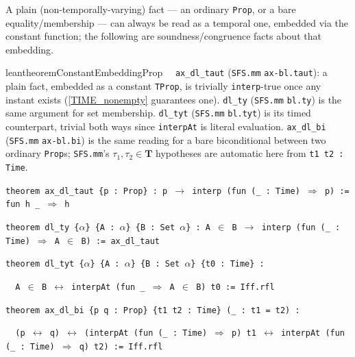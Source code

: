 \pn A plain (non-temporally-varying) fact --- an ordinary \texttt{Prop}, or a bare equality/membership --- can always be read as a temporal one, embedded via the constant function; the following are soundness/congruence facts about that embedding.

\begin{restatable}{leantheorem}{ConstantEmbeddingProp}~~ \texttt{ax\_dl\_taut} (\texttt{SFS.mm} \texttt{ax-bl.taut}): a plain fact, embedded as a constant \texttt{TProp}, is trivially \texttt{interp}-true once any instant exists (\ref{TIME_nonempty} guarantees one). \texttt{dl\_ty} (\texttt{SFS.mm} \texttt{bl.ty}) is the same argument for set membership. \texttt{dl\_tyt} (\texttt{SFS.mm} \texttt{bl.tyt}) is its timed counterpart, trivial both ways since \texttt{interpAt} is literal evaluation. \texttt{ax\_dl\_bi} (\texttt{SFS.mm} \texttt{ax-bl.bi}) is the same reading for a bare biconditional between two ordinary \texttt{Prop}s; \texttt{SFS.mm}'s $\tau_1,\tau_2\in\mathbf{T}$ hypotheses are automatic here from \texttt{t1 t2 : Time}.

\texttt{\textcolor{leancolor}{theorem} \textcolor{leanyellow}{ax\_dl\_taut} \{p : Prop\} : p $\to$ interp (\textcolor{leancolor}{fun} (\_ : Time) $\Rightarrow$ p) := \textcolor{leancolor}{fun} h \_ $\Rightarrow$ h}

\texttt{\textcolor{leancolor}{theorem} \textcolor{leanyellow}{dl\_ty} \{$\alpha$\} \{A : $\alpha$\} \{B : Set $\alpha$\} : A $\in$ B $\to$ interp (\textcolor{leancolor}{fun} (\_ : Time) $\Rightarrow$ A $\in$ B) := ax\_dl\_taut}

\texttt{\textcolor{leancolor}{theorem} \textcolor{leanyellow}{dl\_tyt} \{$\alpha$\} \{A : $\alpha$\} \{B : Set $\alpha$\} \{t0 : Time\} :}

\texttt{~~A $\in$ B $\leftrightarrow$ interpAt (\textcolor{leancolor}{fun} \_ $\Rightarrow$ A $\in$ B) t0 := Iff.rfl}

\texttt{\textcolor{leancolor}{theorem} \textcolor{leanyellow}{ax\_dl\_bi} \{p q : Prop\} \{t1 t2 : Time\} (\_ : t1 = t2) :}

\texttt{~~(p $\leftrightarrow$ q) $\leftrightarrow$ (interpAt (\textcolor{leancolor}{fun} (\_ : Time) $\Rightarrow$ p) t1 $\leftrightarrow$ interpAt (\textcolor{leancolor}{fun} (\_ : Time) $\Rightarrow$ q) t2) := Iff.rfl}
\label{ax_dl_taut}
\label{dl_ty}
\label{dl_tyt}
\label{ax_dl_bi}
\end{restatable}

